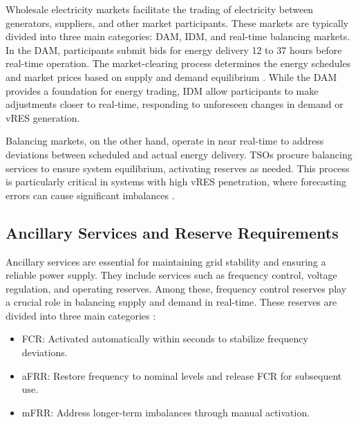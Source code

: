 Wholesale electricity markets facilitate the trading of electricity between generators, suppliers, and other market participants. These markets are typically divided into three main categories: \gls{DAM}, \gls{IDM}, and real-time balancing markets. In the \gls{DAM}, participants submit bids for energy delivery 12 to 37 hours before real-time operation. The market-clearing process determines the energy schedules and market prices based on supply and demand equilibrium \cite{Algarvio:19b}. While the \gls{DAM} provides a foundation for energy trading, \gls{IDM} allow participants to make adjustments closer to real-time, responding to unforeseen changes in demand or \gls{vRES} generation.\par

Balancing markets, on the other hand, operate in near real-time to address deviations between scheduled and actual energy delivery. \gls{TSO}s procure balancing services to ensure system equilibrium, activating reserves as needed. This process is particularly critical in systems with high \gls{vRES} penetration, where forecasting errors can cause significant imbalances \cite{Algarvio:19a}.\par

\subsection{Ancillary Services and Reserve Requirements}

Ancillary services are essential for maintaining grid stability and ensuring a reliable power supply. They include services such as frequency control, voltage regulation, and operating reserves. Among these, frequency control reserves play a crucial role in balancing supply and demand in real-time. These reserves are divided into three main categories \cite{Algarvio:19a}:

\begin{itemize}
    \item	\gls{FCR}: Activated automatically within seconds to stabilize frequency deviations.
    \item	\gls{aFRR}: Restore frequency to nominal levels and release FCR for subsequent use.
    \item	\gls{mFRR}: Address longer-term imbalances through manual activation.
\end{itemize}



